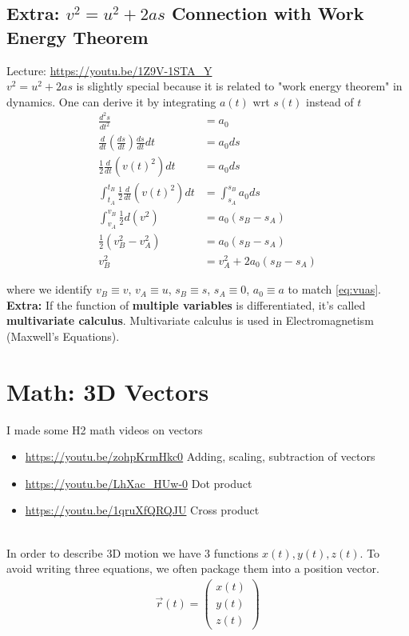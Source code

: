 \documentclass{article}
\begin{document}
\subsection{Extra: $v^2 = u^2 + 2as$ Connection with Work Energy Theorem}
Lecture: \url{https://youtu.be/1Z9V-1STA_Y} \\[10pt]
$v^2 = u^2 + 2as$ is slightly special because it is related to "work energy theorem" in dynamics. One can derive it by integrating $a(t)$ wrt $s(t)$ instead of $t$ 
\begin{align}
    \frac{d^2 s}{dt^2} &= a_0 \\
    \frac{d}{dt} \left(\frac{ds}{dt}\right) \frac{ds}{dt} dt &= a_0 ds \\
    \frac{1}{2} \frac{d}{dt} \left( v(t)^2 \right) dt &= a_0 ds \\
    \int_{t_A}^{t_B} \frac{1}{2} \frac{d}{dt} \left( v(t)^2 \right) dt &= \int_{s_A}^{s_B} a_0 ds \\
    \int_{v_A}^{v_B} \frac{1}{2} d\left( v^2 \right) &= a_0 (s_B - s_A) \\
    \frac{1}{2} (v_B^2 - v_A^2) &= a_0 (s_B - s_A) \\
    v_B^2 &= v_A^2 + 2a_0(s_B - s_A)
\end{align}

where we identify $v_B \equiv v$, $v_A \equiv u$, $s_B \equiv s$, $s_A \equiv 0$, $a_0 \equiv a$ to match \ref{eq:vuas}.
\\
 
\textbf{Extra:} If the function of \textbf{multiple variables} is differentiated, it's called \textbf{multivariate calculus}. Multivariate calculus is used in Electromagnetism (Maxwell's Equations).



\section{Math: 3D Vectors}

I made some H2 math videos on vectors 
\begin{itemize}
    \item \url{https://youtu.be/zohpKrmHkc0} Adding, scaling, subtraction of vectors
    \item \url{https://youtu.be/LhXac_HUw-0} Dot product
    \item \url{https://youtu.be/1qruXfQRQJU} Cross product
\end{itemize}
\leavevmode \\
In order to describe 3D motion we have 3 functions $x(t),y(t),z(t)$. To avoid writing three equations, we often package them into a position vector.
\begin{align}
    \vec{r}(t) = \left(
    \begin{array}{c}  
         x(t) \\
         y(t) \\
         z(t)
    \end{array}
    \right)
\end{align}
\end{document}
